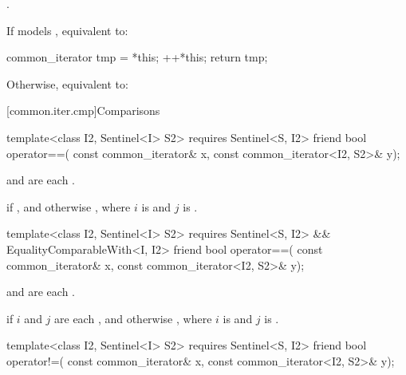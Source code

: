 \begin{itemdescr}
\pnum
\expects {}.

\pnum
\effects
If  models , equivalent to:
\begin{codeblock}
common_iterator tmp = *this;
++*this;
return tmp;
\end{codeblock}
Otherwise, equivalent to: 
\end{itemdescr}

[common.iter.cmp]{Comparisons}

%
\begin{itemdecl}
template<class I2, Sentinel<I> S2>
  requires Sentinel<S, I2>
friend bool operator==(
  const common_iterator& x, const common_iterator<I2, S2>& y);
\end{itemdecl}

\begin{itemdescr}
\pnum
\expects
{} and 
are each .

\pnum
\returns
{} if ,
and otherwise ,
where $i$ is  and $j$ is .
\end{itemdescr}

%
\begin{itemdecl}
template<class I2, Sentinel<I> S2>
  requires Sentinel<S, I2> && EqualityComparableWith<I, I2>
friend bool operator==(
  const common_iterator& x, const common_iterator<I2, S2>& y);
\end{itemdecl}

\begin{itemdescr}
\pnum
\expects
{} and 
are each .

\pnum
\returns
{} if $i$ and $j$ are each , and otherwise
, where
$i$ is  and $j$ is .
\end{itemdescr}

%
\begin{itemdecl}
template<class I2, Sentinel<I> S2>
  requires Sentinel<S, I2>
friend bool operator!=(
  const common_iterator& x, const common_iterator<I2, S2>& y);
\end{itemdecl}

